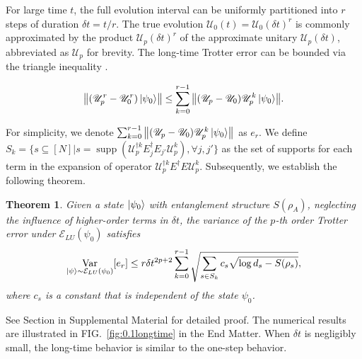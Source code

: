 \documentclass[showpacs,amsmath,amssymb,twocolumn,aps,pra,superscriptaddress,notitlepage,10pt]{revtex4-2}
\newcommand{\cE}{\mathcal E_{LU}}
\newcommand{\sU}{\mathscr U}
\newcommand{\kp}{\ket{\psi}}
\newtheorem{theorem}{Theorem}
\begin{document}
For large time $t$, the full evolution interval can be uniformly partitioned into $r$ steps of duration $\delta t=t/r$.
The true evolution $\sU_0(t)=\sU_0(\delta t)^r$ is commonly approximated by the product $\sU_p(\delta t)^r$ of the approximate unitary $\sU_p(\delta t)$, abbreviated as $\sU_p$ for brevity. The long-time Trotter error can be bounded via the triangle inequality \cite{seesm}.

\begin{equation}
    \begin{aligned}
        \norm{(\sU_p^r-\sU_0^r)\ket{\psi_0}}\le\sum_{k=0}^{r-1}\norm{(\sU_p-\sU_0)\sU_p^k\ket{\psi_0}}.\label{equ:tri-ineq}
    \end{aligned}
\end{equation}

For simplicity, we denote $\sum_{k=0}^{r-1}\norm{(\sU_p-\sU_0)\sU_p^k\ket{\psi_0}}$ as $e_r$. We define $S_k=\{s\subseteq[N]|s=\operatorname{supp}(\sU_p^{\dagger k}E_j^\dagger E_{j'}\sU_p^k),\forall j,j'\}$ as the set of supports for each term in the expansion of operator $\sU_p^{\dagger k}E^\dagger E\sU_p^k$. Subsequently, we establish the following theorem.

\begin{theorem}
    Given a state $\ket{\psi_0}$ with entanglement structure $S(\rho_A)$, neglecting the influence of higher-order terms in $\delta t$, the variance of the $p$-th order Trotter error under $\cE(\psi_0)$ satisfies
    \begin{equation}
        \mathop{\operatorname{Var}}_{\kp\sim\cE(\psi_0)}[e_r]\le r\delta t^{2p+2}\sum_{k=0}^{r-1}\sqrt{\sum_{s\in S_k}c_s\sqrt{\log d_s-S(\rho_s)}},
    \end{equation}
    where $c_s$ is a constant that is independent of the state $\psi_0$.
\end{theorem}

See Section \uppercase\expandafter{} in Supplemental Material \cite{seesm} for detailed proof. The numerical results are illustrated in FIG.~\ref{fig:0.1longtime} in the End Matter. When $\delta t$ is negligibly small, the long-time behavior is similar to the one-step behavior.
\end{document}
